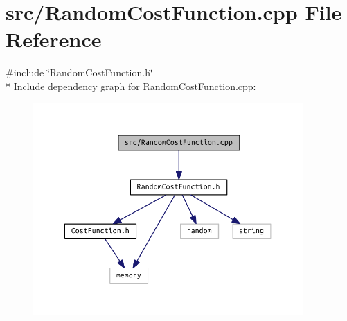 \section{src/\+Random\+Cost\+Function.cpp File Reference}
\label{_random_cost_function_8cpp}
{\ttfamily \#include \char`\"{}Random\+Cost\+Function.\+h\char`\"{}}\\*
Include dependency graph for Random\+Cost\+Function.\+cpp\+:
\nopagebreak
\begin{figure}[H]
\begin{center}
\leavevmode
\includegraphics[width=292pt]{_random_cost_function_8cpp__incl}
\end{center}
\end{figure}
